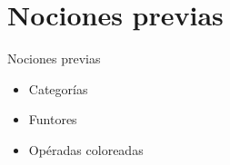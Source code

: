 \documentclass[12pt,aspectratio=169]{beamer}
\numberwithin{equation}{section}
\theoremstyle{definition}
\newtheorem{defi}[teo]{Definici\'on}
\begin{document}
{
\AtBeginSection{}
\section{Nociones previas}
\begin{frame}{Nociones previas}
    \begin{itemize}
        \item Categor\'ias
        \item Funtores
        \item Op\'eradas coloreadas
    \end{itemize}
\end{frame}


}
\end{document}
